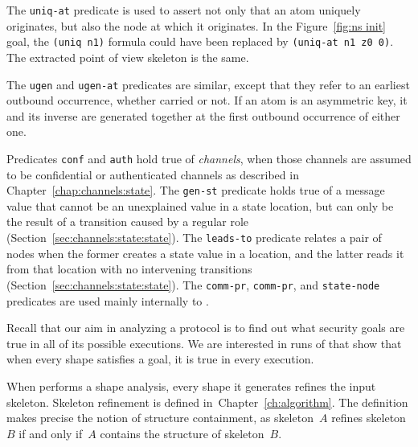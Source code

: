 The \texttt{uniq-at} predicate is used to assert not only that an atom
uniquely originates, but also the node at which it originates.  In the
Figure~\ref{fig:ns init} goal, the \texttt{(uniq n1)} formula could
have been replaced by \texttt{(uniq-at n1 z0 0)}.  The extracted point
of view skeleton is the same.

The \texttt{ugen} and \texttt{ugen-at} predicates are similar, except
that they refer to an earliest outbound occurrence, whether carried or
not.  If an atom is an asymmetric key, it and its inverse are
generated together at the first outbound occurrence of either one.

Predicates \texttt{conf} and \texttt{auth} hold true of
\emph{channels}, when those channels are assumed to be confidential or
authenticated channels as described in
Chapter~\ref{chap:channels:state}.  The \texttt{gen-st} predicate
holds true of a message value that cannot be an unexplained value in a
state location, but can only be the result of a transition caused by a
regular role (Section~\ref{sec:channels:state:state}).  The
\texttt{leads-to} predicate relates a pair of nodes when the former
creates a state value in a location, and the latter reads it from that
location with no intervening transitions
(Section~\ref{sec:channels:state:state}).  The \texttt{comm-pr},
\texttt{comm-pr}, and \texttt{state-node} predicates are used mainly
internally to {\cpsa}.   

\iffalse{
    In the Diffie-Hellman algebra (see Section~\ref{sec:input:dh}), a
    random exponent $x\colon\sym{rndx}$ is \texttt{absent} from a term
    $t\colon\sym{expt}$ if the latter is a monomial in which $x$ is of
    degree 0.  Homomorphisms must preserve this positive formula,
    meaning that, given a skeleton satisfying
    $\texttt{absent}(x,\alpha)$, a map such as $\alpha\mapsto xy$ is
    not a homomorphism instantiating $\alpha$.  It would map $\alpha$
    to a monomial in which $x$ has degree 1.  }
\fi

Recall that our aim in analyzing a protocol is to find out what
security goals are true in all of its possible executions.  We are
interested in runs of {\cpsa} that show that when every shape
satisfies a goal, it is true in every execution.

When {\cpsa} performs a shape analysis, every shape it generates
refines the input skeleton.  Skeleton refinement is defined
in~Chapter~\ref{ch:algorithm}.  The definition makes precise the
notion of structure containment, as skeleton~$A$ refines skeleton~$B$
if and only if~$A$ contains the structure of skeleton~$B$.

